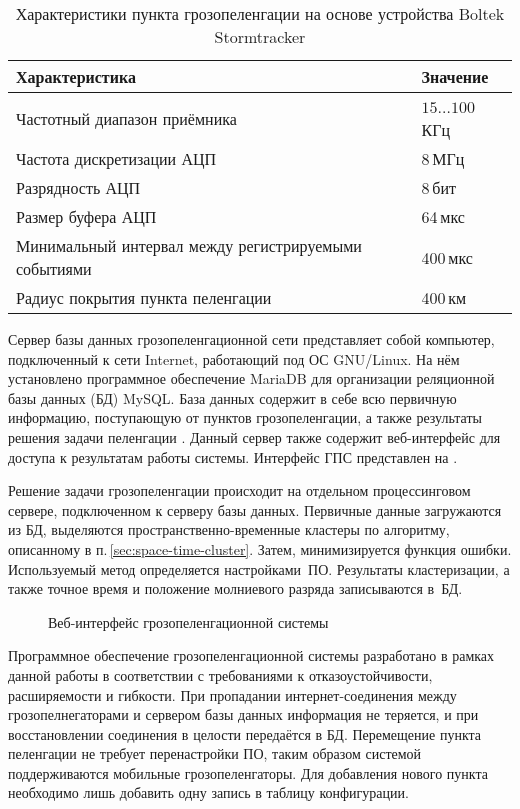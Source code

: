 \begin{table}[h]
	\begin{center}
		\begin{tabular}{l|l}
			Характеристика & Значение \\
			\hline
			Частотный диапазон приёмника & $15\ldots100$\,КГц \\
			Частота дискретизации АЦП & 8\,МГц \\
			Разрядность АЦП & 8\,бит \\
			Размер буфера АЦП & 64\,мкс \\
			Минимальный интервал между регистрируемыми событиями & 400\,мкс \\
			Радиус покрытия пункта пеленгации & 400\,км \\
		\end{tabular}	
	\end{center}
	\caption{Характеристики пункта грозопеленгации на основе устройства Boltek Stormtracker}
	\label{tab:lds-pars}
\end{table}

Сервер базы данных грозопеленгационной сети представляет собой компьютер, подключенный к сети Internet, работающий под ОС GNU/Linux. На нём установлено программное обеспечение MariaDB для организации реляционной базы данных (БД) MySQL. База данных содержит в себе всю первичную информацию, поступающую от пунктов грозопеленгации, а также результаты решения задачи пеленгации \cite{rcpl2014}. Данный сервер также содержит веб-интерфейс для доступа к результатам работы системы. Интерфейс ГПС представлен на .

Решение задачи грозопеленгации происходит на отдельном процессинговом сервере, подключенном к серверу базы данных. Первичные данные загружаются из БД, выделяются пространственно-временные кластеры по алгоритму, описанному в п.\,\ref{sec:space-time-cluster}. Затем, минимизируется функция ошибки. Используемый метод определяется настройками~ПО. Результаты кластеризации, а также точное время и положение молниевого разряда записываются в~БД.

\begin{figure}[h]
	\caption{Веб-интерфейс грозопеленгационной системы}
	\label{fig:lds-web-interface}
\end{figure}

Программное обеспечение грозопеленгационной системы разработано в рамках данной работы в соответствии с требованиями к отказоустойчивости, расширяемости и гибкости. При пропадании интернет-соединения между грозопелнегаторами и сервером базы данных информация не теряется, и при восстановлении соединения в целости передаётся в БД. Перемещение пункта пеленгации не требует перенастройки ПО, таким образом системой поддерживаются мобильные грозопеленгаторы. Для добавления нового пункта необходимо лишь добавить одну запись в таблицу конфигурации.

